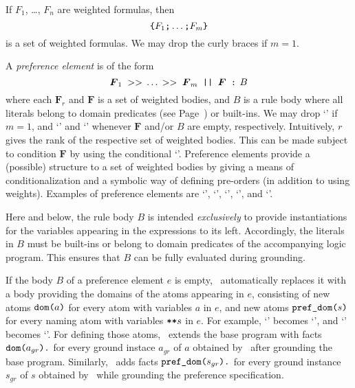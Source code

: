 If $F_1$, \ldots, $F_n$ are weighted formulas, then
\[
\texttt{\{}F_1\texttt{;}\dots\texttt{;}F_m\texttt{\}}
\]
is a set of weighted formulas.
We may drop the curly braces if $m=1$.

A \emph{preference element} is of the form
\[\boldsymbol{F}_1\; >> \,\dots\, >> \;\boldsymbol{F}_m\texttt{ || }\boldsymbol{F}\texttt{ : }\!\!\!\! B\]
where each $\boldsymbol{F}_r$ and $\boldsymbol{F}$ is a set of weighted bodies, 
and $B$ is a rule body where all literals belong to domain predicates
(see Page~\pageref{pg:domain}) or built-ins.
%
We may drop `\code{>>}' if $m=1$, 
and `' and `' whenever $\boldsymbol{F}$ and/or $B$ are empty, respectively.
%
Intuitively, $r$ gives the rank of the respective set of weighted bodies.
This can be made subject to condition $\boldsymbol{F}$ by using the conditional `\code{||}'.
Preference elements provide a (possible) structure to a set of weighted bodies
by giving a means of conditionalization and a symbolic way of defining pre-orders (in addition to using weights).
%
%
Examples of preference elements are 
`', 
`',  
`', 
`',  and
`'.

\begin{note}
Here and below, 
the rule body $B$ is intended \emph{exclusively} to provide instantiations for the variables appearing in the expressions to its left.  
Accordingly, the literals in $B$ must be built-ins or belong to domain predicates of the accompanying logic program.
This ensures that $B$ can be fully evaluated during grounding.
\end{note}

\begin{note}\label{asprin:nobody}
If the body $B$ of a preference element $e$ is empty,
\asprin\ automatically replaces it with a body 
providing the domains of the atoms appearing in $e$,
consisting of new atoms $\texttt{dom(}a\texttt{)}$ 
for every atom with variables $a$ in $e$, 
and new atoms $\texttt{pref\_dom(}s\texttt{)}$ 
for every naming atom with variables $\texttt{**}s$ in $e$.
%
For example, 
`' becomes
`', and 
`' becomes
`'.
%
For defining those atoms, 
\asprin\ extends the base program with facts 
$\texttt{dom(}a_{gr}\texttt{).}$ for every ground instace $a_{gr}$ of $a$ obtained by \clingo\
after grounding the base program.
%
Similarly, \asprin\ adds facts  
$\texttt{pref\_dom(}s_{gr}\texttt{).}$
for every ground instance $s_{gr}$ of $s$ obtained by \clingo\
while grounding the preference specification.
\end{note}

